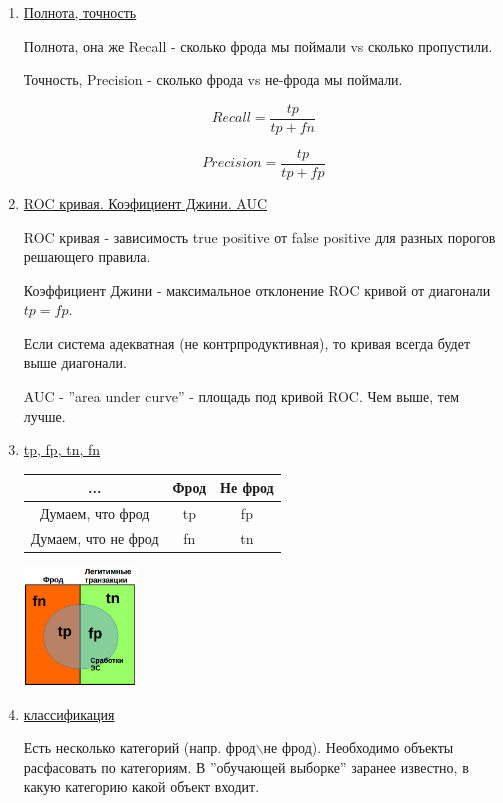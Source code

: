\documentclass{proc}
\begin{document}
	
	\begin{enumerate}
		
		\item \uline{Полнота, точность}
		
		Полнота, она же Recall - сколько фрода мы поймали vs сколько пропустили.
		
		Точность, Precision - сколько фрода vs не-фрода мы поймали.
		
		$$Recall = \frac{tp}{tp+fn}$$
		
		$$Precision = \frac{tp}{tp+fp}$$
		
		\item \uline{ROC кривая. Коэфициент Джини.  AUC}
		
		ROC кривая - зависимость true positive от false positive для разных порогов решающего правила.
		
		Коэффициент Джини - максимальное отклонение ROC кривой от диагонали $tp = fp$.
		
		Если система адекватная (не контрпродуктивная), то кривая всегда будет выше диагонали.
		
		AUC - ''area under curve'' - площадь под кривой ROC. Чем выше, тем лучше.
		
		\item \uline{tp, fp, tn, fn}
		
		\begin{center}
			\begin{tabular}{| c | c | c |}
				\hline
				... & Фрод & Не фрод \\ \hline
				Думаем, что фрод & tp & fp \\ \hline
				Думаем, что не фрод & fn & tn \\ \hline
			\end{tabular}
			
			\includegraphics[width=3cm]{tptnfpfn}
		\end{center}
		
		
		\item \uline{классификация}
		
		Есть несколько категорий (напр. фрод$\backslash$не фрод). Необходимо объекты расфасовать по категориям. В ''обучающей выборке'' заранее известно, в какую категорию какой объект входит. 
		

\end{enumerate}
\end{document}
